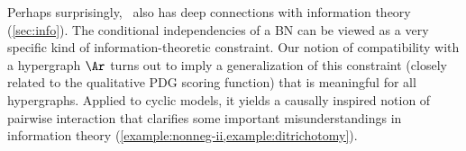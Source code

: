 Perhaps surprisingly,
\cibility\ 
also has deep connections with information theory
(\cref{sec:info}).
The conditional independencies of a BN can be viewed as a very specific kind of information-theoretic constraint.
Our notion of compatibility with a hypergraph $\Ar$ 
    turns out to imply a generalization of this
    constraint (closely related to the qualitative PDG scoring function)
    that is meaningful for all hypergraphs.
Applied to cyclic models, it yields a causally inspired notion of pairwise interaction that clarifies some important misunderstandings in information theory (\cref{example:nonneg-ii,example:ditrichotomy}).
